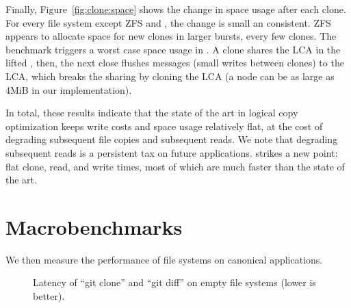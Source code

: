 Finally, Figure~\ref{fig:clone:space} shows the change in space usage after
each clone.
For every file system except ZFS and \betrfsFive, the change is small an
consistent.
ZFS appears to allocate space for new clones in larger bursts, every few clones.
The benchmark triggers a worst case space usage in \betrfsFive.
A clone shares the LCA in the lifted \bedag, then, the next close flushes
messages (small writes between clones) to the LCA, which breaks the sharing
by cloning the LCA (a node can be as large as 4MiB in our implementation).

In total, these results indicate that the state of the art in logical copy
optimization keeps write costs and space usage relatively flat,
at the cost of degrading subsequent file copies and subsequent reads.
We note that degrading subsequent reads is a persistent tax on future
applications.
\betrfsFive strikes a new point: flat clone, read, and write times,
most of which are much faster than the state of the art.

\section{Macrobenchmarks}
\label{sec:macro}

We then measure the performance of file systems on canonical applications.

\begin{figure}[t]
    \centering
    \caption[Git benchmark on empty file systems]{\label{fig:git_empty}
        Latency of ``git clone'' and ``git diff'' on empty file systems (lower is better).}
\end{figure}

